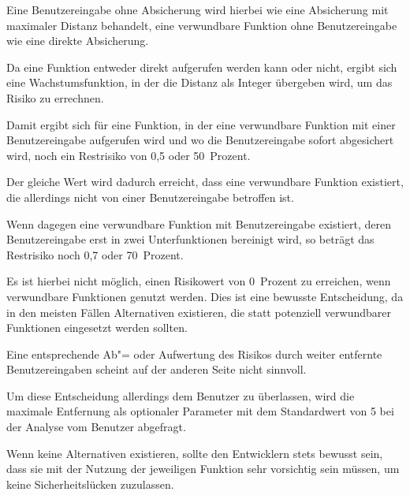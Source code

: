                Eine Benutzereingabe ohne Absicherung wird hierbei
                wie eine Absicherung mit maximaler Distanz behandelt,
                eine verwundbare Funktion ohne Benutzereingabe wie eine direkte Absicherung.

                Da eine Funktion entweder direkt aufgerufen werden kann oder
                nicht,
                ergibt sich eine Wachstumsfunktion,
                in der die Distanz als Integer übergeben wird,
                um das Risiko zu errechnen.

                Damit ergibt sich für eine Funktion,
                in der eine verwundbare Funktion mit einer Benutzereingabe aufgerufen wird und
                wo die Benutzereingabe sofort abgesichert wird,
                noch ein Restrisiko von 0,5 oder
                50~Prozent.

                Der gleiche Wert wird dadurch erreicht,
                dass eine verwundbare Funktion existiert,
                die allerdings nicht von einer Benutzereingabe betroffen ist.

                Wenn dagegen eine verwundbare Funktion mit Benutzereingabe existiert,
                deren Benutzereingabe erst in zwei Unterfunktionen bereinigt wird,
                so beträgt das Restrisiko noch 0,7 oder
                70~Prozent.

                Es ist hierbei nicht möglich,
                einen Risikowert von 0~Prozent zu erreichen,
                wenn verwundbare Funktionen genutzt werden.
                Dies ist eine bewusste Entscheidung,
                da in den meisten Fällen Alternativen existieren,
                die statt potenziell verwundbarer Funktionen eingesetzt werden sollten.

                Eine entsprechende Ab"= oder
                Aufwertung des Risikos durch weiter entfernte Benutzereingaben scheint auf der anderen Seite nicht sinnvoll.

                Um diese Entscheidung allerdings dem Benutzer zu überlassen,
                wird die maximale Entfernung als optionaler Parameter mit dem Standardwert von 5 bei der Analyse vom Benutzer abgefragt.

                Wenn keine Alternativen existieren,
                sollte den Entwicklern stets bewusst sein,
                dass sie mit der Nutzung der jeweiligen Funktion sehr vorsichtig sein müssen,
                um keine Sicherheitslücken zuzulassen.

